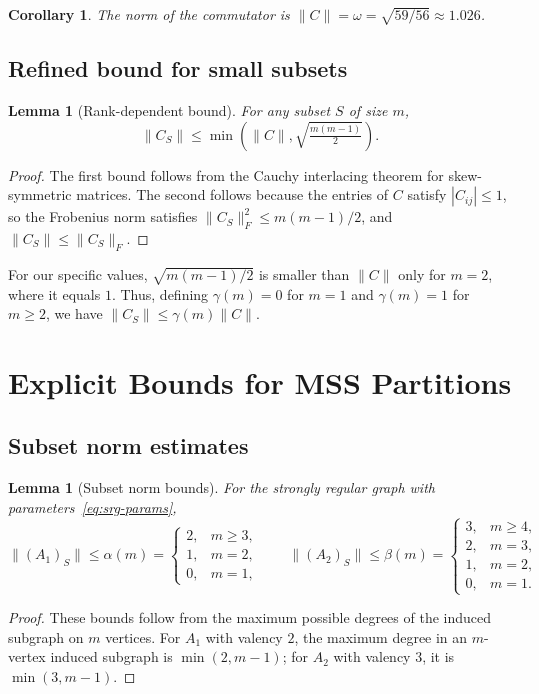 \documentclass[a4paper]{amsart}
\theoremstyle{plain}
\newtheorem{corollary}[theorem]{Corollary}
\newtheorem{lemma}[theorem]{Lemma}
\theoremstyle{definition}
\theoremstyle{remark}
\begin{document}
	\begin{corollary} The norm of the commutator is $\|C\| = \omega = \sqrt{59/56} \approx 1.026$.
	\end{corollary}
	
	\subsection{Refined bound for small subsets}
	\label{subsec:refined-bound}
	
	\begin{lemma}[Rank-dependent bound]\label{lem:rank-bound}
		For any subset $S$ of size $m$,
		\[
		\|C_S\| \le \min\left(\|C\|, \sqrt{\tfrac{m(m-1)}{2}}\right).
		\]
	\end{lemma}
	\begin{proof} The first bound follows from the Cauchy interlacing theorem for skew-symmetric matrices. The second follows because the entries of $C$ satisfy $|C_{ij}| \le 1$, so the Frobenius norm satisfies $\|C_S\|_F^2 \le m(m-1)/2$, and $\|C_S\| \le \|C_S\|_F$.
	\end{proof}
	
	For our specific values, $\sqrt{m(m-1)/2}$ is smaller than $\|C\|$ only for $m=2$, where it equals $1$. Thus, defining $\gamma(m) = 0$ for $m=1$ and $\gamma(m)=1$ for $m\ge 2$, we have $\|C_S\| \le \gamma(m) \|C\|$.
	
	\section{Explicit Bounds for MSS Partitions}
	\label{sec:bounds}
	
	\subsection{Subset norm estimates}
	\label{subsec:subset-norms}
	
	\begin{lemma}[Subset norm bounds]\label{lem:subset-norms}
		For the strongly regular graph with parameters~\eqref{eq:srg-params},
		\[
		\|(A_1)_S\| \le \alpha(m) =
		\begin{cases}
			2, & m \ge 3,\\
			1, & m = 2,\\
			0, & m = 1,
		\end{cases}
		\qquad
		\|(A_2)_S\| \le \beta(m) =
		\begin{cases}
			3, & m \ge 4,\\
			2, & m = 3,\\
			1, & m = 2,\\
			0, & m = 1.
		\end{cases}
		\]
	\end{lemma}
	\begin{proof} These bounds follow from the maximum possible degrees of the induced subgraph on $m$ vertices. For $A_1$ with valency $2$, the maximum degree in an $m$-vertex induced subgraph is $\min(2, m-1)$; for $A_2$ with valency $3$, it is $\min(3, m-1)$.
	\end{proof}
	
\end{document}
